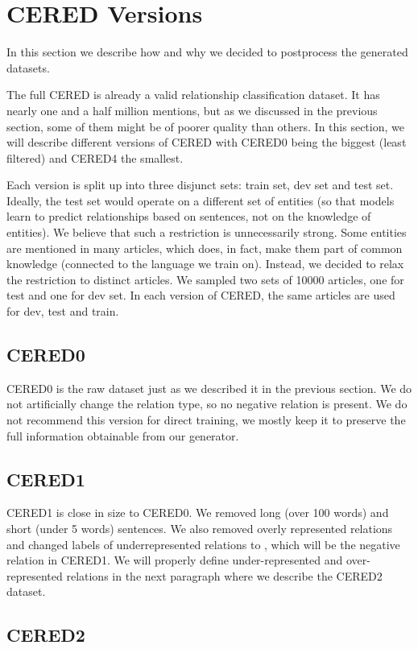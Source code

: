\section{CERED Versions}
In this section we describe how and why we decided to postprocess the generated datasets. 

The full CERED is already a valid relationship classification dataset. It has nearly one and a half million mentions, but as we discussed in the previous section, some of them might be of poorer quality than others. In this section, we will describe different versions of CERED with CERED0 being the biggest (least filtered) and CERED4 the smallest. 


Each version is split up into three disjunct sets: train set, dev set and test set. Ideally, the test set would operate on a different set of entities (so that models learn to predict relationships based on sentences, not on the knowledge of entities). We believe that such a restriction is unnecessarily strong. Some entities are mentioned in many articles, which does, in fact, make them part of common knowledge (connected to the language we train on). Instead, we decided to relax the restriction to distinct articles. We sampled two sets of 10000 articles, one for test and one for dev set. In each version of CERED, the same articles are used for dev, test and train.
\subsection{CERED0}
CERED0 is the raw dataset just as we described it in the previous section. We do not artificially change the relation type, so no negative relation is present. We do not recommend this version for direct training, we mostly keep it to preserve the full information obtainable from our generator.

\subsection{CERED1}
CERED1 is close in size to CERED0. We removed long (over 100 words) and short (under 5 words) sentences. We also removed overly represented relations and changed labels of underrepresented relations to , which will be the negative relation in CERED1. We will properly define under-represented and over-represented relations in the next paragraph where we describe the CERED2 dataset.

\subsection{CERED2}

